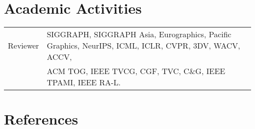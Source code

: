 \documentclass[letterpaper,10pt]{article} %
\newcommand{\blankline}{\quad\pagebreak[2]}
\begin{document}
{\section{Academic Activities}


\begin{tabular}{rl}
Reviewer & SIGGRAPH, SIGGRAPH Asia, Eurographics, Pacific Graphics, NeurIPS, ICML, ICLR, CVPR, 3DV, WACV, ACCV, \\
  & ACM TOG, IEEE TVCG, CGF, TVC, C\&G, IEEE TPAMI, IEEE RA-L. \\
\end{tabular}
\blankline


\section{References}

}
\end{document}
